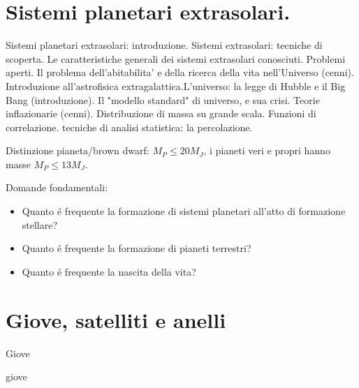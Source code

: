 
\section{Sistemi planetari extrasolari.}
Sistemi planetari extrasolari: introduzione.
 Sistemi extrasolari: tecniche di scoperta. 
Le caratteristiche generali dei sistemi extrasolari conosciuti. Problemi aperti. Il problema dell'abitabilita' e della ricerca della vita nell'Universo (cenni). Introduzione all'astrofisica extragalattica.L'universo: la legge di Hubble e il Big Bang (introduzione). 
Il "modello standard" di universo, e sua crisi. Teorie inflazionarie (cenni).
Distribuzione di massa su grande scala. Funzioni di correlazione. tecniche di analisi statistica: la percolazione.

Distinzione pianeta/brown dwarf: $M_P\leq20M_J$, i pianeti veri e propri hanno masse $M_P\leq13M_J$.

Domande fondamentali:
\begin{itemize}
    \item Quanto \'e frequente la formazione di sistemi planetari all'atto di formazione stellare?
    \item Quanto \'e frequente la formazione di pianeti terrestri?
    \item Quanto \'e frequente la nascita della vita?
\end{itemize}

\section{Giove, satelliti e anelli}

\begin{frame}{Giove}


\end{frame}

\begin{wordonframe}{giove}


\end{wordonframe}
